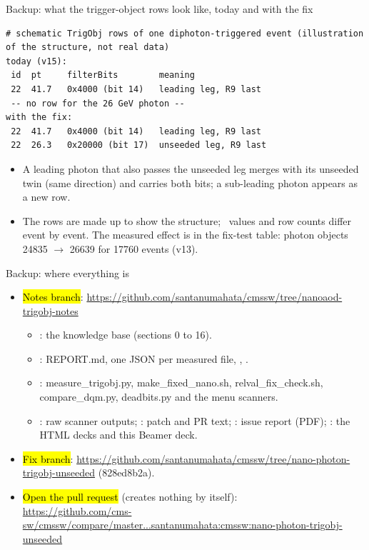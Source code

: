 \begin{frame}[fragile]{Backup: what the trigger-object rows look like, today and with the fix}
\begin{lstlisting}
# schematic TrigObj rows of one diphoton-triggered event (illustration of the structure, not real data)
today (v15):
 id  pt     filterBits        meaning
 22  41.7   0x4000 (bit 14)   leading leg, R9 last
 -- no row for the 26 GeV photon --
with the fix:
 22  41.7   0x4000 (bit 14)   leading leg, R9 last
 22  26.3   0x20000 (bit 17)  unseeded leg, R9 last
\end{lstlisting}
  \begin{itemize}\small
    \item A leading photon that also passes the unseeded leg merges with its unseeded twin (same direction) and carries
          both bits; a sub-leading photon appears as a new row.
    \item The rows are made up to show the structure; \pT\ values and row counts differ event by event. The measured
          effect is in the fix-test table: photon objects 24835 $\to$ 26639 for 17760 events (v13).
  \end{itemize}
\end{frame}

\begin{frame}{Backup: where everything is}
  \begin{itemize}\small
    \item \hl{Notes branch}: \url{https://github.com/santanumahata/cmssw/tree/nanoaod-trigobj-notes}
      \begin{itemize}\scriptsize
        \item {}: the knowledge base (sections 0 to 16).
        \item {}: REPORT.md, one JSON per measured file, , .
        \item {}: measure\_trigobj.py, make\_fixed\_nano.sh, relval\_fix\_check.sh, compare\_dqm.py,
              deadbits.py and the menu scanners.
        \item {}: raw scanner outputs; : patch and PR text; : issue report (PDF);
              : the HTML decks and this Beamer deck.
      \end{itemize}
    \item \hl{Fix branch}: \url{https://github.com/santanumahata/cmssw/tree/nano-photon-trigobj-unseeded} (828ed8b2a).
    \item \hl{Open the pull request} (creates nothing by itself):\\
          {\scriptsize\url{https://github.com/cms-sw/cmssw/compare/master...santanumahata:cmssw:nano-photon-trigobj-unseeded}}
  \end{itemize}
\end{frame}


